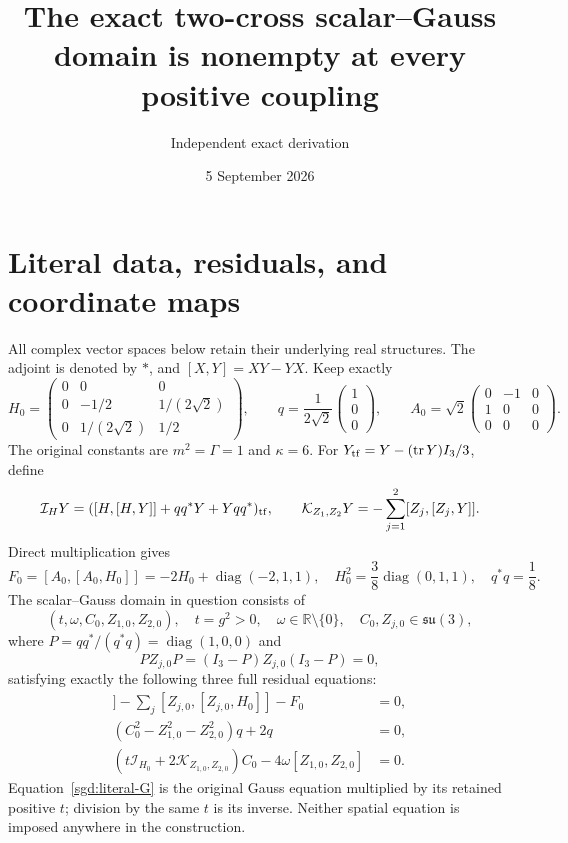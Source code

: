 \documentclass[11pt]{article}
\title{The exact two-cross scalar--Gauss domain is nonempty at every positive coupling}
\author{Independent exact derivation}
\date{5 September 2026}
\newcommand{\su}{\mathfrak{su}}
\newcommand{\tr}{\operatorname{tr}}
\newcommand{\diag}{\operatorname{diag}}
\begin{document}
\maketitle

\section{Literal data, residuals, and coordinate maps}

All complex vector spaces below retain their underlying real structures.
The adjoint is denoted by $*$, and $[X,Y]=XY-YX$. Keep exactly
\[
 H_0=\begin{pmatrix}0&0&0\\0&-1/2&1/(2\sqrt2)\\
 0&1/(2\sqrt2)&1/2\end{pmatrix},\qquad
 q=\frac1{2\sqrt2}\begin{pmatrix}1\\0\\0\end{pmatrix},\qquad
 A_0=\sqrt2\begin{pmatrix}0&-1&0\\1&0&0\\0&0&0\end{pmatrix}.
\]
The original constants are $m^2=\Gamma=1$ and $\kappa=6$.
For $Y_{\rm tf}=Y-(\tr Y)I_3/3$, define
\[
 \mathcal I_HY=([H,[H,Y]]+qq^*Y+Yqq^*)_{\rm tf},\qquad
 \mathcal K_{Z_1,Z_2}Y=-\sum_{j=1}^2[Z_j,[Z_j,Y]].
\]
Direct multiplication gives
\[
 F_0=[A_0,[A_0,H_0]]=-2H_0+\diag(-2,1,1),\quad
 H_0^2=\frac38\diag(0,1,1),\quad q^*q=\frac18.
\]
The scalar--Gauss domain in question consists of
\[
 (t,\omega,C_0,Z_{1,0},Z_{2,0}),\quad t=g^2>0,\quad
 \omega\in\mathbb R\setminus\{0\},\quad C_0,Z_{j,0}\in\su(3),
\]
where $P=qq^*/(q^*q)=\diag(1,0,0)$ and
\[
 PZ_{j,0}P=(I_3-P)Z_{j,0}(I_3-P)=0,
\]
satisfying exactly the following three full residual equations:
\begin{align}
 [C_0,[C_0,H_0]]-\sum_j[Z_{j,0},[Z_{j,0},H_0]]-F_0&=0,
 \label{sgd:literal-H}\\
 (C_0^2-Z_{1,0}^2-Z_{2,0}^2)q+2q&=0,
 \label{sgd:literal-q}\\
 (t\mathcal I_{H_0}+2\mathcal K_{Z_{1,0},Z_{2,0}})C_0
             -4\omega[Z_{1,0},Z_{2,0}]&=0.
 \label{sgd:literal-G}
\end{align}
Equation~\eqref{sgd:literal-G} is the original Gauss equation multiplied
by its retained positive $t$; division by the same $t$ is its inverse.
Neither spatial equation is imposed anywhere in the construction.
\end{document}
